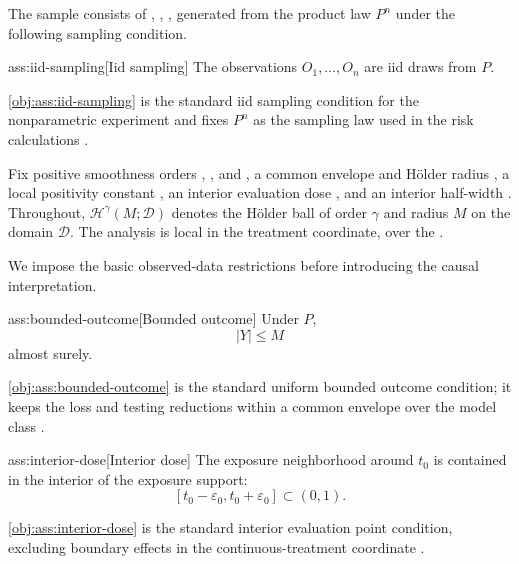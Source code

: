\documentclass[11pt]{article}
\begin{document}
The sample consists of , , , generated from the product law \(P^n\) under the following sampling condition.

\begin{assumptionv}{ass:iid-sampling}[Iid sampling]
The observations \(O_1,\ldots,O_n\) are iid draws from \(P\).
\end{assumptionv}

\cref{obj:ass:iid-sampling} is the standard iid sampling condition for the nonparametric experiment and fixes \(P^n\) as the sampling law used in the risk calculations \citep{tsybakov2009}.

Fix positive smoothness orders , , and , a common envelope and Hölder radius , a local positivity constant , an interior evaluation dose , and an interior half-width . Throughout, \(\mathcal H^\gamma(M;\mathcal D)\) denotes the Hölder ball of order \(\gamma\) and radius \(M\) on the domain \(\mathcal D\). The analysis is local in the treatment coordinate, over the .

We impose the basic observed-data restrictions before introducing the causal interpretation.

\begin{assumptionv}{ass:bounded-outcome}[Bounded outcome]
Under \(P\),
\[
|Y|\le M
\]
almost surely.
\end{assumptionv}

\cref{obj:ass:bounded-outcome} is the standard uniform bounded outcome condition; it keeps the loss and testing reductions within a common envelope over the model class \citep{bonvini2022}.

\begin{assumptionv}{ass:interior-dose}[Interior dose]
The exposure neighborhood around \(t_0\) is contained in the interior of the exposure support:
\[
[t_0-\varepsilon_0,t_0+\varepsilon_0]\subset(0,1).
\]
\end{assumptionv}

\cref{obj:ass:interior-dose} is the standard interior evaluation point condition, excluding boundary effects in the continuous-treatment coordinate \citep{colangelo2020}.
\end{document}
